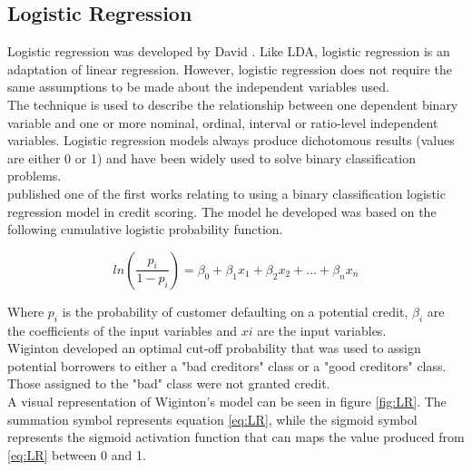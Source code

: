 \subsection{Logistic Regression}

Logistic regression was developed by David \textcite{LogReg}. Like LDA, logistic regression is an adaptation of linear regression. However, logistic regression does not require the same assumptions to be made about the independent variables used. \\

The technique is used to describe the relationship between one dependent binary variable and one or more nominal, ordinal, interval or ratio-level independent variables. Logistic regression models always produce dichotomous results (values are either 0 or 1) and have been widely used to solve binary classification problems. \\

\textcite{LogRegWiginton} published one of the first works relating to using a binary classification logistic regression model in credit scoring. The model he developed was based on the following cumulative logistic probability function.

\vspace{10pt}

\begin{equation} \label{eq:LR}
ln(\frac{p_{i}}{1-p_{i}}) = \beta_{0} + \beta_{1}x_{1} + \beta_{2}x_{2}+ ... +  \beta_{n}x_{n}
\end{equation}

\vspace{10pt}

Where $p_{i}$ is the probability of customer defaulting on a potential credit, $\beta_{i}$ are the coefficients of the input variables and $x{i}$ are the input variables. \\

Wiginton developed an optimal cut-off probability that was used to assign potential borrowers to either a "bad creditors" class or a "good creditors" class. Those assigned to the "bad" class were not granted credit.  \\

A visual representation of Wiginton's model can be seen in figure \ref{fig:LR}. The summation symbol represents equation \ref{eq:LR}, while the sigmoid symbol represents the sigmoid activation function that can maps the value produced from \ref{eq:LR} between 0 and 1.

\vspace{10pt}

